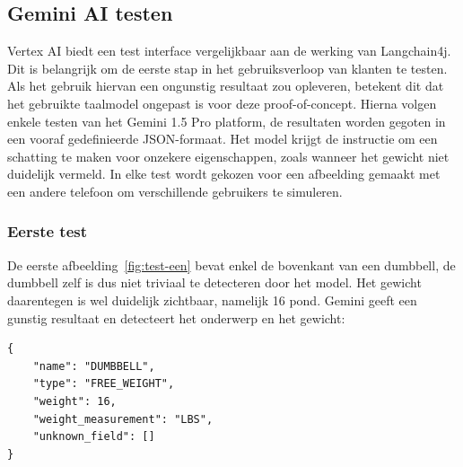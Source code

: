 \subsection{Gemini AI testen}
\label{subsec:gemini-ai-testen}
Vertex AI biedt een test interface vergelijkbaar aan de werking van Langchain4j.
Dit is belangrijk om de eerste stap in het gebruiksverloop van klanten te testen.
Als het gebruik hiervan een ongunstig resultaat zou opleveren, betekent dit dat het gebruikte taalmodel ongepast is voor deze proof-of-concept.
Hierna volgen enkele testen van het Gemini 1.5 Pro platform, de resultaten worden gegoten in een vooraf gedefinieerde JSON-formaat.
Het model krijgt de instructie om een schatting te maken voor onzekere eigenschappen, zoals wanneer het gewicht niet duidelijk vermeld.
In elke test wordt gekozen voor een afbeelding gemaakt met een andere telefoon om verschillende gebruikers te simuleren.

\subsubsection{Eerste test}
De eerste afbeelding~\ref{fig:test-een} bevat enkel de bovenkant van een dumbbell, de dumbbell zelf is dus niet triviaal te detecteren door het model.
Het gewicht daarentegen is wel duidelijk zichtbaar, namelijk 16 pond.
Gemini geeft een gunstig resultaat en detecteert het onderwerp en het gewicht:
\begin{mdframed}[backgroundcolor=bg]
    \begin{verbatim}
{
    "name": "DUMBBELL",
    "type": "FREE_WEIGHT",
    "weight": 16,
    "weight_measurement": "LBS",
    "unknown_field": []
}
    \end{verbatim}
\end{mdframed}

